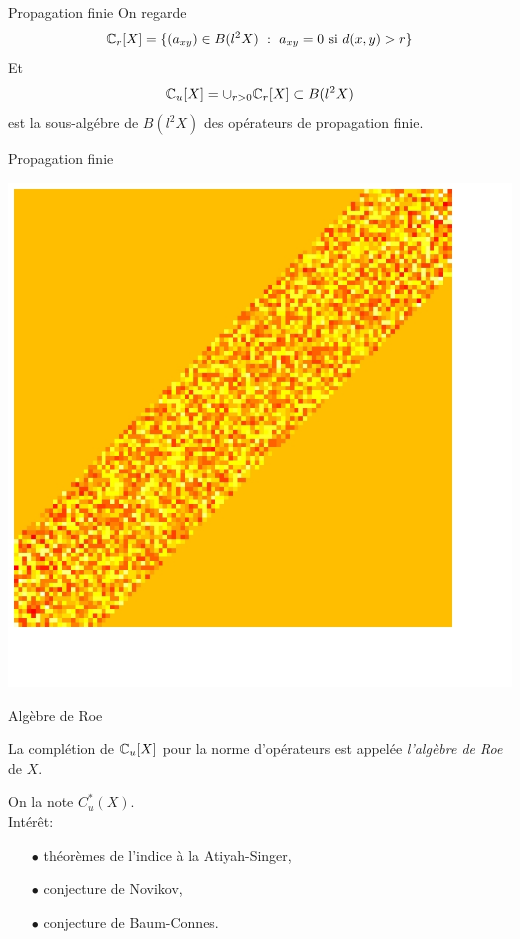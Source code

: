 \begin{frame}{Propagation finie}
On regarde \[\mathbb C_r [X] = \{ (a_{xy})\in B(l^2 X) \ : \ a_{xy }=0 \text{ si } d(x,y)> r\}  \]
Et \[\mathbb C_u[X] = \cup_{r>0} \mathbb C_r[X] \subset B(l^2 X) \]
est la sous-alg\'ebre de $B(l^2 X)$ des op\'erateurs de propagation finie.
\vfill
\end{frame}

\begin{frame}{Propagation finie}
\begin{center}%
\vfill
\includegraphics[width=0.8\linewidth]{finite_propagation}
\vfill
\end{center}%

\end{frame}

\begin{frame}{Alg\`ebre de Roe}
\begin{definition}
La compl\'etion de $\mathbb C_u[X]$ pour la norme d'op\'erateurs est appel\'ee \textit{l'alg\`ebre de Roe} de $X$. 
\end{definition}
\vfill
On la note $C^*_u(X)$.\\
\vfill
Int\'er\^{e}t: 
\begin{itemize}
\item[$\bullet$] th\'eor\`emes de l'indice \`a la Atiyah-Singer,
\item[$\bullet$] conjecture de Novikov,
\item[$\bullet$] conjecture de Baum-Connes.
\end{itemize}
\end{frame}

